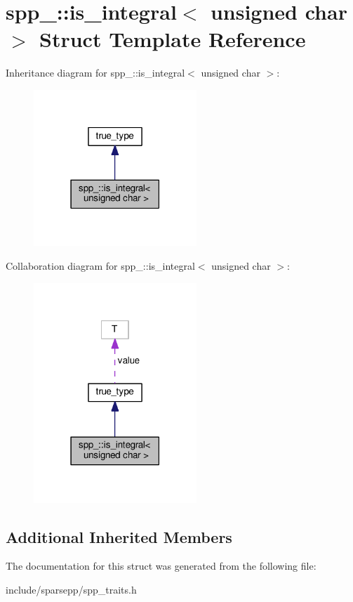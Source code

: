 \hypertarget{structspp___1_1is__integral_3_01unsigned_01char_01_4}{}\section{spp\+\_\+\+:\+:is\+\_\+integral$<$ unsigned char $>$ Struct Template Reference}
\label{structspp___1_1is__integral_3_01unsigned_01char_01_4}


Inheritance diagram for spp\+\_\+\+:\+:is\+\_\+integral$<$ unsigned char $>$\+:\nopagebreak
\begin{figure}[H]
\begin{center}
\leavevmode
\includegraphics[width=174pt]{structspp___1_1is__integral_3_01unsigned_01char_01_4__inherit__graph}
\end{center}
\end{figure}


Collaboration diagram for spp\+\_\+\+:\+:is\+\_\+integral$<$ unsigned char $>$\+:\nopagebreak
\begin{figure}[H]
\begin{center}
\leavevmode
\includegraphics[width=174pt]{structspp___1_1is__integral_3_01unsigned_01char_01_4__coll__graph}
\end{center}
\end{figure}
\subsection*{Additional Inherited Members}


The documentation for this struct was generated from the following file\+:\begin{DoxyCompactItemize}
\item 
include/sparsepp/spp\+\_\+traits.\+h\end{DoxyCompactItemize}
